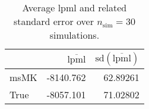 \begin{table}[H]

\caption{Average lpml and related standard error over $n_{\text{sim}} = 30$ simulations.}
\centering
\begin{tabular}[t]{lrr}
\toprule
  & $\overbar{\text{lpml}}$ & $\text{sd}(\overbar{\text{lpml}})$\\
\midrule
msMK & -8140.762 & 62.89261\\
True & -8057.101 & 71.02802\\
\bottomrule
\end{tabular}
\end{table}